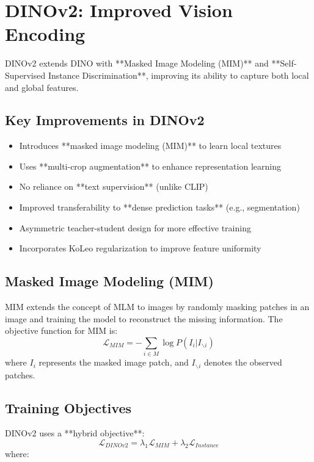 \documentclass[
]{book}
\begin{document}
\chapter{DINOv2: Improved Vision Encoding}\label{dinov2-improved-vision-encoding-1}

DINOv2 extends DINO with **Masked Image Modeling (MIM)** and
**Self-Supervised Instance Discrimination**, improving its ability
to capture both local and global features.

\section{Key Improvements in DINOv2}\label{key-improvements-in-dinov2-1}

\begin{itemize}
\item
  Introduces **masked image modeling (MIM)** to learn local
  textures
\item
  Uses **multi-crop augmentation** to enhance representation
  learning
\item
  No reliance on **text supervision** (unlike CLIP)
\item
  Improved transferability to **dense prediction tasks** (e.g.,
  segmentation)
\item
  Asymmetric teacher-student design for more effective training
\item
  Incorporates KoLeo regularization to improve feature uniformity
\end{itemize}

\section{Masked Image Modeling (MIM)}\label{masked-image-modeling-mim-1}

MIM extends the concept of MLM to images by randomly masking patches in
an image and training the model to reconstruct the missing information.
The objective function for MIM is:
\[\mathcal{L}_{MIM} = - \sum_{i \in M} \log P(I_i | I_{\backslash i})\]
where \(I_i\) represents the masked image patch, and \(I_{\backslash i}\)
denotes the observed patches.

\section{Training Objectives}\label{training-objectives-1}

DINOv2 uses a **hybrid objective**:
\[\mathcal{L}_{DINOv2} = \lambda_1 \mathcal{L}_{MIM} + \lambda_2 \mathcal{L}_{Instance}\]
where:
\end{document}
